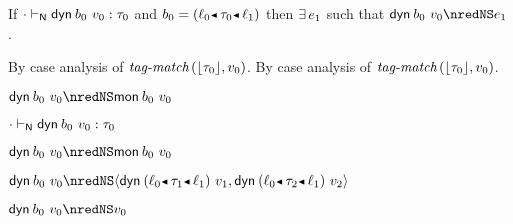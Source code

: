 \begin{lemma}\label{H-dyn-type-progress}
  If\/ ${\cdot} \vdash_{\mathsf{N}} \mathsf{dyn}^{}\,b_0~v_0 : \tau_0$
  and\/ $\sbnd_0 \eeq \obnd{\sowner_0}{\stype_0}{\sowner_1}$
  then\/ $\exists\,e_1$
  such that\/ $\edynb{\sbnd_0}{\svalue_0} \nredNS \sexpr_1$.
\end{lemma}{
  \newcommand{\shortproof}{By case analysis of $\fshallow{\tagof{\stype_0}}{\svalue_0}$.}
\begin{lamportproof*}
  \shortproof
\mainproof
  \shortproof

    \begin{pfproof}
      \qedstep
        \begin{pfproof}
          $\edynb{\sbnd_0}{\svalue_0} \nredNS \emon{\sbnd_0}{\svalue_0}$
        \end{pfproof}
    \end{pfproof}

    \begin{pfproof}
      \absurdstep
        \begin{pfproof}
          ${\cdot} \vdash_{\mathsf{N}} \mathsf{dyn}^{}\,b_0~v_0 : \tau_0$
        \end{pfproof}
    \end{pfproof}

    \begin{pfproof}
      \qedstep
        \begin{pfproof}
          $\edynb{\sbnd_0}{\svalue_0} \nredNS \emon{\sbnd_0}{\svalue_0}$
        \end{pfproof}
    \end{pfproof}

    \begin{pfproof}
      \qedstep
        \begin{pfproof}
          $\edynb{\sbnd_0}{\svalue_0} \nredNS \epair{\edynb{\obnd{\sowner_0}{\stype_1}{\sowner_1}}{\svalue_1}}{\edynb{\obnd{\sowner_0}{\stype_2}{\sowner_1}}{\svalue_2}}$
        \end{pfproof}
    \end{pfproof}

    \begin{pfproof}
      \qedstep
        \begin{pfproof}
          $\edynb{\sbnd_0}{\svalue_0} \nredNS \svalue_0$
        \end{pfproof}
    \end{pfproof}


\end{lamportproof*}}
